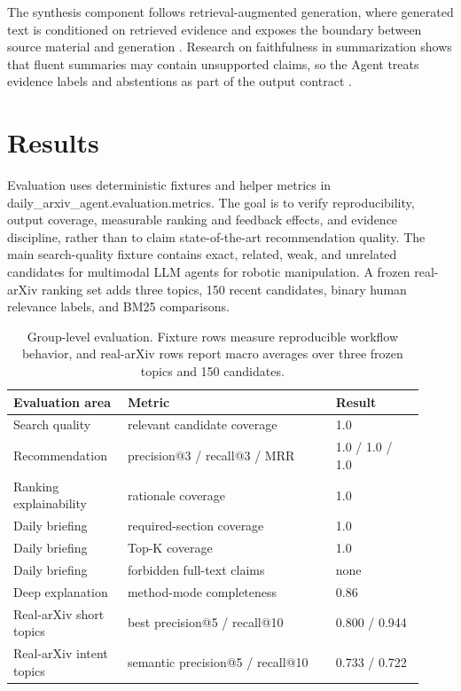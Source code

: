 \documentclass{article}
\begin{document}
The synthesis component follows retrieval-augmented generation, where generated text is conditioned on retrieved evidence and exposes the boundary between source material and generation \citep{lewis2020}. Research on faithfulness in summarization shows that fluent summaries may contain unsupported claims, so the Agent treats evidence labels and abstentions as part of the output contract \citep{maynez2020}.

\section{Results}

Evaluation uses deterministic fixtures and helper metrics in daily\_arxiv\_agent.evaluation.metrics. The goal is to verify reproducibility, output coverage, measurable ranking and feedback effects, and evidence discipline, rather than to claim state-of-the-art recommendation quality. The main search-quality fixture contains exact, related, weak, and unrelated candidates for multimodal LLM agents for robotic manipulation. A frozen real-arXiv ranking set adds three topics, 150 recent candidates, binary human relevance labels, and BM25 comparisons.

\begin{table}[t]
  \centering
  \caption{Group-level evaluation. Fixture rows measure reproducible workflow behavior, and real-arXiv rows report macro averages over three frozen topics and 150 candidates.}
  \label{tab:group-results}
  \small
  \begin{tabular}{@{}p{0.25\linewidth}p{0.47\linewidth}p{0.20\linewidth}@{}}
    \toprule
    Evaluation area & Metric & Result \\
    \midrule
    Search quality & relevant candidate coverage & 1.0 \\
    Recommendation & precision@3 / recall@3 / MRR & 1.0 / 1.0 / 1.0 \\
    Ranking explainability & rationale coverage & 1.0 \\
    Daily briefing & required-section coverage & 1.0 \\
    Daily briefing & Top-K coverage & 1.0 \\
    Daily briefing & forbidden full-text claims & none \\
    Deep explanation & method-mode completeness & 0.86 \\
    Real-arXiv short topics & best precision@5 / recall@10 & 0.800 / 0.944 \\
    Real-arXiv intent topics & semantic precision@5 / recall@10 & 0.733 / 0.722 \\
    \bottomrule
  \end{tabular}
\end{table}
\end{document}
